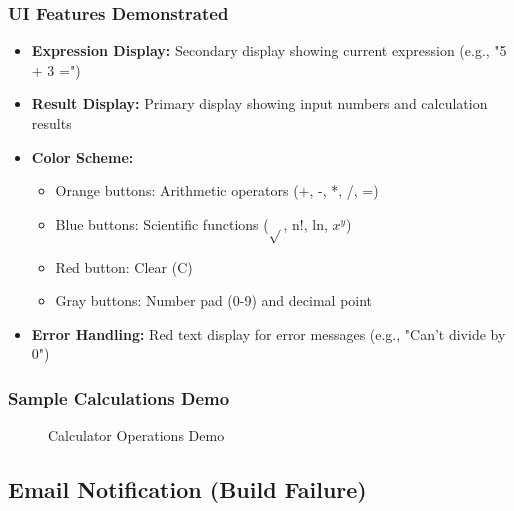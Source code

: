 \documentclass[12pt,a4paper]{article}
\begin{document}
\subsubsection{UI Features Demonstrated}

\begin{itemize}
    \item \textbf{Expression Display:} Secondary display showing current expression (e.g., "5 + 3 =")
    \item \textbf{Result Display:} Primary display showing input numbers and calculation results
    \item \textbf{Color Scheme:}
    \begin{itemize}
        \item Orange buttons: Arithmetic operators (+, -, *, /, =)
        \item Blue buttons: Scientific functions ($\sqrt{}$, n!, ln, $x^y$)
        \item Red button: Clear (C)
        \item Gray buttons: Number pad (0-9) and decimal point
    \end{itemize}
    \item \textbf{Error Handling:} Red text display for error messages (e.g., "Can't divide by 0")
\end{itemize}

\subsubsection{Sample Calculations Demo}

\begin{figure}[H]
    \centering
    \caption{Calculator Operations Demo}
    \label{fig:calculator-demo}
\end{figure}

\subsection{Email Notification (Build Failure)}
\end{document}
